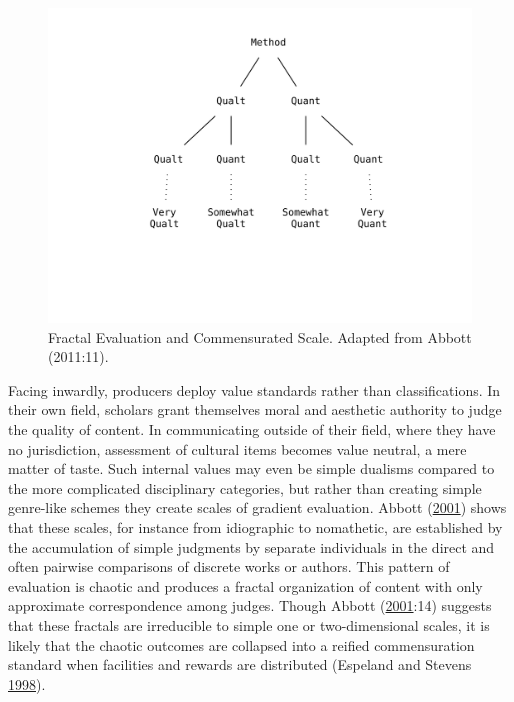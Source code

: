 \documentclass[]{book}
\theoremstyle{definition}
\theoremstyle{definition}
\theoremstyle{definition}
\theoremstyle{remark}
\begin{document}
\begin{figure}

{\centering \includegraphics[width=8.47in]{img/fractal} 

}

\caption{Fractal Evaluation and Commensurated Scale. Adapted from Abbott (2011:11).}\label{fig:fractalp}
\end{figure}

Facing inwardly, producers deploy value standards rather than
classifications. In their own field, scholars grant themselves moral and
aesthetic authority to judge the quality of content. In communicating
outside of their field, where they have no jurisdiction, assessment of
cultural items becomes value neutral, a mere matter of taste. Such
internal values may even be simple dualisms compared to the more
complicated disciplinary categories, but rather than creating simple
genre-like schemes they create scales of gradient evaluation. Abbott
(\protect\hyperlink{ref-Abbott2001Chaos}{2001}) shows that these scales,
for instance from idiographic to nomathetic, are established by the
accumulation of simple judgments by separate individuals in the direct
and often pairwise comparisons of discrete works or authors. This
pattern of evaluation is chaotic and produces a fractal organization of
content with only approximate correspondence among judges. Though Abbott
(\protect\hyperlink{ref-Abbott2001Chaos}{2001}:14) suggests that these
fractals are irreducible to simple one or two-dimensional scales, it is
likely that the chaotic outcomes are collapsed into a reified
commensuration standard when facilities and rewards are distributed
(Espeland and Stevens
\protect\hyperlink{ref-Espeland1998Commensuration}{1998}).
\end{document}
